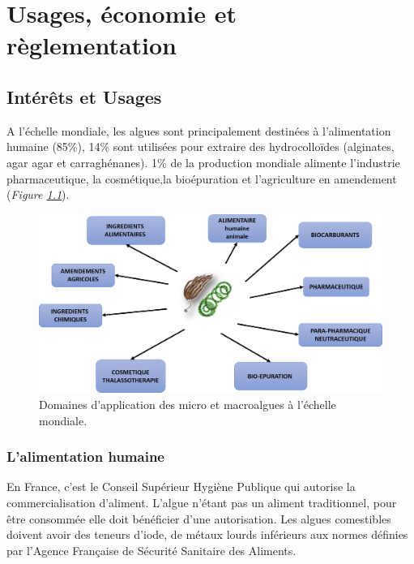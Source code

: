 \documentclass[
]{book}
\begin{document}
\hypertarget{usage}{%
\chapter{Usages, économie et règlementation}\label{usage}}

\hypertarget{intuxe9ruxeats-et-usages}{%
\section{Intérêts et Usages}\label{intuxe9ruxeats-et-usages}}

A l'échelle mondiale, les algues sont principalement destinées à l'alimentation humaine (85\%), 14\% sont utilisées pour extraire des hydrocolloïdes (alginates, agar agar et carraghénanes). 1\% de la production mondiale alimente l'industrie pharmaceutique, la cosmétique,la bioépuration et l'agriculture en amendement (\emph{Figure \ref{fig:application}}).

\begin{figure}

{\centering \includegraphics[width=23.79in]{images/application} 

}

\caption{Domaines d'application des micro et macroalgues à l'échelle mondiale.}\label{fig:application}
\end{figure}

\hypertarget{lalimentation-humaine}{%
\subsection{L'alimentation humaine}\label{lalimentation-humaine}}

En France, c'est le Conseil Supérieur Hygiène Publique qui autorise la commercialisation d'aliment. L'algue n'étant pas un aliment traditionnel, pour être consommée elle doit bénéficier d'une autorisation. Les algues comestibles doivent avoir des teneurs d'iode, de métaux lourds inférieurs aux normes définies par l'Agence Française de Sécurité Sanitaire des Aliments.
\end{document}
